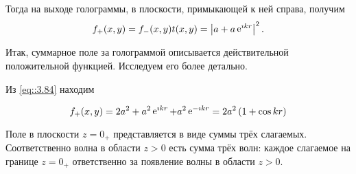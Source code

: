 Тогда на выходе голограммы, в плоскости, примыкающей к ней справа, получим
\begin{equation}\label{eq::3.84}
  f_+(x,y) = f_-(x,y)t(x,y) = \left|a +  a\mathop{\mathrm e}\nolimits^{\imath kr}\right|^2.
\end{equation}

Итак, суммарное поле за голограммой описывается действительной положительной функцией. Исследуем его более детально.

Из \eqref{eq::3.84} находим

\begin{equation}\label{eq::3.85}
  f_ +(x, y) = 2a^2 + a^2 \mathop{\mathrm e}\nolimits^{\imath kr} + a^2 \mathop{\mathrm e}\nolimits^{ -\imath kr} = 
  2a^2\left(1 + \cos{kr} \right)
\end{equation}

Поле в плоскости $z = 0_+$ представляется в виде суммы трёх слагаемых. Соответственно волна в области $z > 0$ есть сумма трёх волн: 
каждое слагаемое на границе $z = 0_+$ ответственно за появление 
волны в области $z > 0$.

